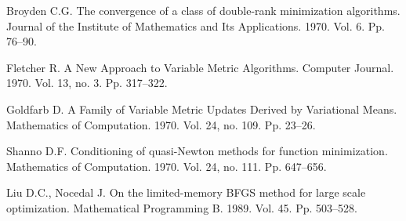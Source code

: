 \documentclass[12pt]{llncs}
\begin{document}
\begin{thebibliography}{5}

Broyden  C.G. 
The convergence of a class of double-rank minimization algorithms. Journal of the Institute of Mathematics and Its Applications. 1970. Vol. 6. Pp. 76--90.

Fletcher  R. 
A New Approach to Variable Metric Algorithms. Computer Journal. 1970. Vol. 13, no. 3. Pp. 317--322.

Goldfarb  D. 
A Family of Variable Metric Updates Derived by Variational Means. Mathematics of Computation. 1970. Vol. 24, no. 109. Pp. 23--26.

Shanno  D.F.  Conditioning of quasi-Newton methods for function minimization. Mathematics of Computation. 1970. Vol. 24, no. 111. Pp. 647--656.

Liu  D.C., Nocedal  J. 
On the limited-memory BFGS method for large scale optimization.
Mathematical Programming B. 1989. Vol. 45. Pp. 503--528.


\end{thebibliography}

\end{document}
